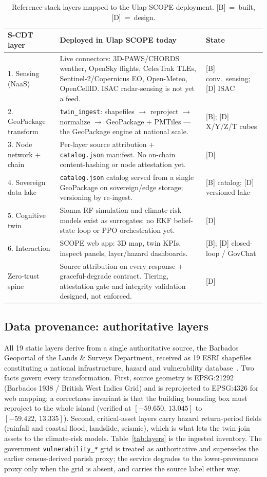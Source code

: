 \documentclass[10pt,twocolumn]{article}
\begin{document}
\begin{table}[t]\footnotesize\centering
\caption{Reference-stack layers mapped to the Ulap SCOPE deployment.
[B]~=~built, [D]~=~design.}\label{tab:map}
\begin{tabular}{@{}p{2.5cm}p{11.1cm}p{2.0cm}@{}}
\toprule
S-CDT layer & Deployed in Ulap SCOPE today & State\\
\midrule
1. Sensing (NaaS) & Live connectors: 3D-PAWS/CHORDS weather, OpenSky flights, CelesTrak TLEs, Sentinel-2/Copernicus EO, Open-Meteo, OpenCellID. ISAC radar-sensing is not yet a feed. & [B] conv.\ sensing; [D] ISAC\\
2. GeoPackage transform & \texttt{twin\_ingest}: shapefiles $\rightarrow$ reproject $\rightarrow$ normalize $\rightarrow$ GeoPackage + PMTiles --- the GeoPackage engine at national scale. & [B]; [D] X/Y/Z/T cubes\\
3. Node network + chain & Per-layer source attribution + \texttt{catalog.json} manifest. No on-chain content-hashing or node attestation yet. & [D]\\
4. Sovereign data lake & \texttt{catalog.json} catalog served from a single GeoPackage on sovereign/edge storage; versioning by re-ingest. & [B] catalog; [D] versioned lake\\
5. Cognitive twin & Sionna RF simulation and climate-risk models exist as surrogates; no EKF belief-state loop or PPO orchestration yet. & [D]\\
6. Interaction & SCOPE web app: 3D map, twin KPIs, inspect panels, layer/hazard dashboards. & [B]; [D] closed-loop / GovChat\\
Zero-trust spine & Source attribution on every response + graceful-degrade contract. Tiering, attestation gate and integrity validation designed, not enforced. & [D]\\
\bottomrule
\end{tabular}
\end{table}

\subsection{Data provenance: authoritative layers}
All 19 static layers derive from a single authoritative source, the Barbados
Geoportal of the Lands \& Surveys Department, received as 19 ESRI shapefiles
constituting a national infrastructure, hazard and vulnerability
database~\cite{bbdgeo}. Two facts govern every transformation. First, source
geometry is EPSG:21292 (Barbados 1938 / British West Indies Grid) and is reprojected
to EPSG:4326 for web mapping; a correctness invariant is that the building bounding
box must reproject to the whole island (verified at $[-59.650,\,13.045]$ to
$[-59.422,\,13.335]$). Second, critical-asset layers carry hazard return-period
fields (rainfall and coastal flood, landslide, seismic), which is what lets the twin
join assets to the climate-risk models. Table~\ref{tab:layers} is the ingested
inventory. The government \texttt{vulnerability\_*} grid is treated as authoritative
and supersedes the earlier census-derived parish proxy; the service degrades to the
lower-provenance proxy only when the grid is absent, and carries the source label
either way.
\end{document}
